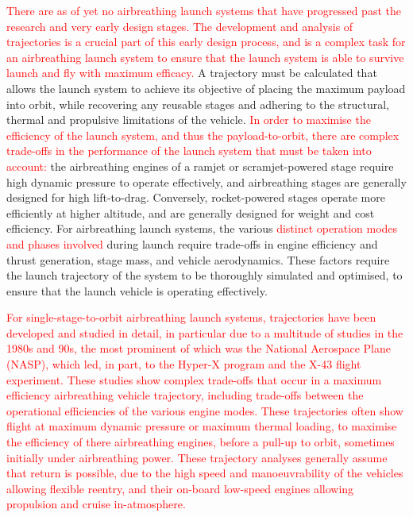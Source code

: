   	\textcolor{red}{There are as of yet no airbreathing launch systems that have progressed past the research and very early design stages\cite{Argus,Powell1991,Trefny1999,Roche2000,Pescetelli2012,Young2006,Bradford2000,Hyperion,Wilhite1991,Fujikawa2017,Mehta2001,Takahashi1997,Aberleen,Germain2001,Eklund2012,Bradford2002,Kimura1999,Preller2018a}. The development and analysis of trajectories is a crucial part of this early design process, and is a complex task for an airbreathing launch system to ensure that the launch system is able to survive launch and fly with maximum efficacy.}
  	 A trajectory must be calculated that allows the launch system to achieve its objective of placing the maximum payload into orbit, while recovering any reusable stages and adhering to the structural, thermal and propulsive limitations of the vehicle\cite{Bulirsch1995}.  
  	\textcolor{red}{ In order to maximise the efficiency of the launch system, and thus the payload-to-orbit, there are complex trade-offs in the performance of the launch system that must be taken into account:} the airbreathing engines of a ramjet or scramjet-powered stage require high dynamic pressure to operate effectively, and airbreathing stages are generally designed for high lift-to-drag. Conversely, rocket-powered stages operate more efficiently at higher altitude, and are generally designed for weight and cost efficiency. For airbreathing launch systems, the various \textcolor{red}{distinct operation modes and phases involved} during launch require trade-offs in engine efficiency and thrust generation, stage mass, and vehicle aerodynamics. These factors require the launch trajectory of the system to be thoroughly simulated and optimised, to ensure that the launch vehicle is operating effectively. 
  	 
  
  	 \textcolor{red}{
  	   For single-stage-to-orbit airbreathing launch systems, trajectories have been developed and studied in detail\cite{Argus,Powell1991,Trefny1999,Roche2000,Pescetelli2012,Young2006,Bradford2000,Hyperion}, in particular due to a multitude of studies in the 1980s and 90s, the most prominent of which was the National Aerospace Plane (NASP), which led, in part, to the Hyper-X program and the X-43 flight experiment\cite{Mcclinton2008}. These studies show complex trade-offs that occur in a maximum efficiency airbreathing vehicle trajectory, including trade-offs between the operational efficiencies of the various engine modes. These trajectories often show flight at maximum dynamic pressure or maximum thermal loading, to maximise the efficiency of there airbreathing engines, before a pull-up to orbit, sometimes initially under airbreathing power. These trajectory analyses generally assume that return is possible, due to the high speed and manoeuvrability of the vehicles allowing flexible reentry, and their on-board low-speed engines allowing propulsion and cruise in-atmosphere. 
  	}
  	
